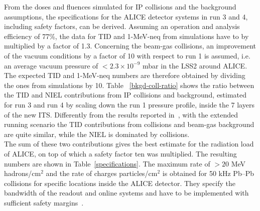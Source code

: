 From the doses and fluences simulated for IP collisions and the background assumptions, the specifications for the ALICE detector systems in {\sc run} 3 and 4, including safety factors, can be derived.
Assuming an operation and analysis efficiency of 77\%, the data for TID and 1-MeV-neq from simulations have to by multiplied by a factor of 1.3. Concerning the beam-gas collisions,
an improvement of the vacuum conditions by a factor of 10 with respect to {\sc run} 1 is assumed, i.e. an average vacuum pressure of $<2.3\times 10^{-9}$ mbar in the LSS2 around ALICE. The expected TID and 1-MeV-neq numbers are therefore obtained by dividing the ones from simulations by 10. 
Table ~\ref{bkgd-coll-ratio} shows the ratio between the TID and NIEL contributions from IP collisions and background, estimated for {\sc run} 3 and {\sc run} 4 by scaling down the {\sc run} 1 pressure profile, inside the 7 layers of the new ITS. Differently from the results reported in~\cite{RadNote}, with the extended running scenario the TID contributions from collisions and beam-gas background are quite similar, while the NIEL is dominated by collisions.\\ 
The sum of these two contributions gives the best estimate for the radiation load of ALICE, on top of which a safety factor ten was multiplied. The resulting numbers are shown in Table~\ref{specifications}.
The maximum rate of $>20$ MeV hadrons/cm$^2$ and the rate of charges particles/cm$^2$ is obtained for 50 kHz Pb--Pb collisions for specific locations inside the ALICE detector. They specify the bandwidth of the readout and online systems and have to be implemented with sufficient safety margins~\cite{RadNote}.


